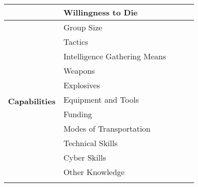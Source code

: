 \documentclass[a4paper]{article}
\begin{document}
\begin{table}[h!]
\begin{tabular}{|l|l|l|l|l|l|}
                                                		        		& \multicolumn{2}{l|}{Willingness to Die}           		&                    &                   &                    				\\ \hline
\multirow{13}{*}{\textbf{Capabilities}}         		& \multicolumn{2}{l|}{Group Size}                   	        &                    &                   &                    				\\ \cline{2-6} 
                                               		        		& \multicolumn{2}{l|}{Tactics}                      	        &                    &                   &                    				\\ \cline{2-6} 
                                                  				& \multicolumn{2}{l|}{Intelligence Gathering Means}  &                    &                   &                    				\\ \cline{2-6} 
                                                 				& \multicolumn{2}{l|}{Weapons}                      		&                    &                   &                    				\\ \cline{2-6} 
                                                  				& \multicolumn{2}{l|}{Explosives}                   		&                    &                   &                    				\\ \cline{2-6} 
                                                  				& \multicolumn{2}{l|}{Equipment and Tools}          	&                    &                   &                    				\\ \cline{2-6} 
                                                  				& \multicolumn{2}{l|}{Funding}                      		&                    &                   &                    				\\ \cline{2-6} 
                                                  				& \multicolumn{2}{l|}{Modes of Transportation}      	&                    &                   &                    				\\ \cline{2-6} 
                                                  				& \multicolumn{2}{l|}{Technical Skills}             		&                    &                   &                    				\\ \cline{2-6} 
                                                  				& \multicolumn{2}{l|}{Cyber Skills}                 		&                    &                   &                    				\\ \cline{2-6} 
                                                  				& \multicolumn{2}{l|}{Other Knowledge}              	&                    &                   &                    				\\ \cline{2-6} 

\end{tabular}
\end{table}
\end{document}
